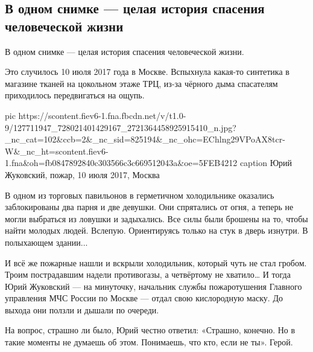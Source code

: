  
 
 
 
 

\subsection{В одном снимке --- целая история спасения человеческой жизни}
\label{sec:27_11_2020.fb.group.rrr.1.jurii_zhukovskii_pozhar_2017}

В одном снимке --- целая история спасения человеческой жизни.

Это случилось 10 июля 2017 года в Москве. Вспыхнула какая-то синтетика в
магазине тканей на цокольном этаже ТРЦ, из-за чёрного дыма спасателям
приходилось передвигаться на ощупь.

\ifcmt
pic https://scontent.fiev6-1.fna.fbcdn.net/v/t1.0-9/127711947_728021401429167_2721364458925915410_n.jpg?_nc_cat=102&ccb=2&_nc_sid=825194&_nc_ohc=EChlng29VPoAX8tcr-W&_nc_ht=scontent.fiev6-1.fna&oh=fb0847892840c303566c3c669512043a&oe=5FEB4212
caption Юрий Жуковский, пожар, 10 июля 2017, Москва
\fi

В одном из торговых павильонов в герметичном холодильнике оказались
заблокированы два парня и две девушки. Они спрятались от огня, а теперь не
могли выбраться из ловушки и задыхались. Все силы были брошены на то, чтобы
найти молодых людей. Вслепую. Ориентируясь только на стук в дверь изнутри. В
полыхающем здании...

И всё же пожарные нашли и вскрыли холодильник, который чуть не стал гробом.
Троим пострадавшим надели противогазы, а четвёртому не хватило… И тогда Юрий
Жуковский --- на минуточку, начальник службы пожаротушения Главного управления
МЧС России по Москве --- отдал свою кислородную маску. До выхода они ползли и
дышали по очереди.

На вопрос, страшно ли было, Юрий честно ответил: «Страшно, конечно. Но в такие
моменты не думаешь об этом. Понимаешь, что кто, если не ты». Герой.
